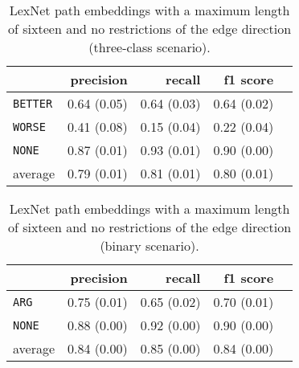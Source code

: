 	\begin{table}[h] 
		\centering 
		\caption{LexNet path embeddings with a maximum length of sixteen and no restrictions of the edge direction (three-class scenario).} 
		\label{  }
		\begin{tabular}{@{}lrrrr@{}}
			\toprule
			        & precision                & recall                   & f1 score                 \\ \midrule 
			\texttt{BETTER}  & 0.64 \scriptsize{(0.05)} & 0.64 \scriptsize{(0.03)} & 0.64 \scriptsize{(0.02)} \\ 
			\texttt{WORSE}   & 0.41 \scriptsize{(0.08)} & 0.15 \scriptsize{(0.04)} & 0.22 \scriptsize{(0.04)} \\ 
			\texttt{NONE}    & 0.87 \scriptsize{(0.01)} & 0.93 \scriptsize{(0.01)} & 0.90 \scriptsize{(0.00)} \\ 
			average & 0.79 \scriptsize{(0.01)} & 0.81 \scriptsize{(0.01)} & 0.80 \scriptsize{(0.01)} \\ 
			\bottomrule
		\end{tabular}
	\end{table}
	
	\begin{table}[h] 
		\centering 
		\caption{LexNet path embeddings with a maximum length of sixteen and no restrictions of the edge direction (binary scenario).} 
		\label{  }
		\begin{tabular}{@{}lrrrr@{}}
			\toprule
			        & precision                & recall                   & f1 score                 \\ \midrule 
			\texttt{ARG}     & 0.75 \scriptsize{(0.01)} & 0.65 \scriptsize{(0.02)} & 0.70 \scriptsize{(0.01)} \\ 
			\texttt{NONE}    & 0.88 \scriptsize{(0.00)} & 0.92 \scriptsize{(0.00)} & 0.90 \scriptsize{(0.00)} \\ 
			average & 0.84 \scriptsize{(0.00)} & 0.85 \scriptsize{(0.00)} & 0.84 \scriptsize{(0.00)} \\ 
			\bottomrule
		\end{tabular}
	\end{table}
	

